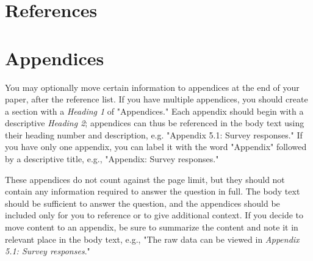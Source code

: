 \documentclass[
	letterpaper, %
]{jdf}
\begin{document}
\section{References}
\printbibliography[heading=none]

\section{Appendices}
You may optionally move certain information to appendices at the end of your paper, after the reference list. If you have multiple appendices, you should create a section with a \emph{Heading 1} of "Appendices." Each appendix should begin with a descriptive \emph{Heading 2}; appendices can thus be referenced in the body text using their heading number and description, e.g. "Appendix 5.1: Survey responses." If you have only one appendix, you can label it with the word "Appendix" followed by a descriptive title, e.g., "Appendix: Survey responses."

These appendices do not count against the page limit, but they should not contain any information required to answer the question in full. The body text should be sufficient to answer the question, and the appendices should be included only for you to reference or to give additional context. If you decide to move content to an appendix, be sure to summarize the content and note it in relevant place in the body text, e.g., "The raw data can be viewed in \emph{Appendix 5.1: Survey responses}."
\end{document}
